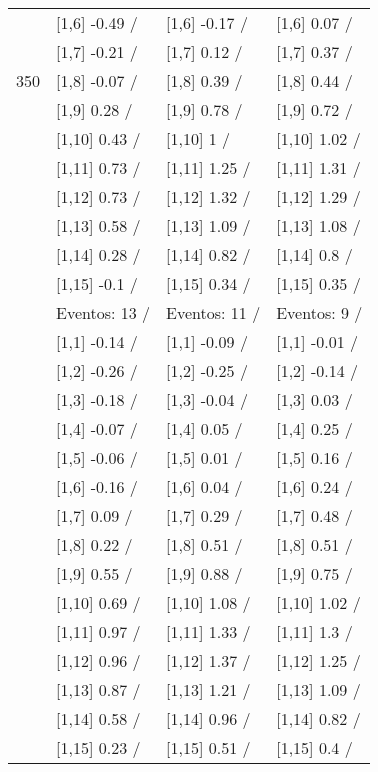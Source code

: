 \begin{table}
\begin{tabular}[t]{llll}
 & {}[1,6] -0.49  / & {}[1,6] -0.17  / & {}[1,6] 0.07  /\\
 & {}[1,7] -0.21  / & {}[1,7] 0.12  / & {}[1,7] 0.37  /\\
350 & {}[1,8] -0.07  / & {}[1,8] 0.39  / & {}[1,8] 0.44  /\\
\addlinespace
 & {}[1,9] 0.28  / & {}[1,9] 0.78  / & {}[1,9] 0.72  /\\
 & {}[1,10] 0.43  / & {}[1,10] 1  / & {}[1,10] 1.02  /\\
 & {}[1,11] 0.73  / & {}[1,11] 1.25  / & {}[1,11] 1.31  /\\
 & {}[1,12] 0.73  / & {}[1,12] 1.32  / & {}[1,12] 1.29  /\\
 & {}[1,13] 0.58  / & {}[1,13] 1.09  / & {}[1,13] 1.08  /\\
\addlinespace
 & {}[1,14] 0.28  / & {}[1,14] 0.82  / & {}[1,14] 0.8  /\\
 & {}[1,15] -0.1  / & {}[1,15] 0.34  / & {}[1,15] 0.35  /\\
 & Eventos:  13 / & Eventos:  11 / & Eventos:  9 /\\
 & {}[1,1] -0.14  / & {}[1,1] -0.09  / & {}[1,1] -0.01  /\\
 & {}[1,2] -0.26  / & {}[1,2] -0.25  / & {}[1,2] -0.14  /\\
\addlinespace
 & {}[1,3] -0.18  / & {}[1,3] -0.04  / & {}[1,3] 0.03  /\\
 & {}[1,4] -0.07  / & {}[1,4] 0.05  / & {}[1,4] 0.25  /\\
 & {}[1,5] -0.06  / & {}[1,5] 0.01  / & {}[1,5] 0.16  /\\
 & {}[1,6] -0.16  / & {}[1,6] 0.04  / & {}[1,6] 0.24  /\\
 & {}[1,7] 0.09  / & {}[1,7] 0.29  / & {}[1,7] 0.48  /\\
\addlinespace
500 & {}[1,8] 0.22  / & {}[1,8] 0.51  / & {}[1,8] 0.51  /\\
 & {}[1,9] 0.55  / & {}[1,9] 0.88  / & {}[1,9] 0.75  /\\
 & {}[1,10] 0.69  / & {}[1,10] 1.08  / & {}[1,10] 1.02  /\\
 & {}[1,11] 0.97  / & {}[1,11] 1.33  / & {}[1,11] 1.3  /\\
 & {}[1,12] 0.96  / & {}[1,12] 1.37  / & {}[1,12] 1.25  /\\
\addlinespace
 & {}[1,13] 0.87  / & {}[1,13] 1.21  / & {}[1,13] 1.09  /\\
 & {}[1,14] 0.58  / & {}[1,14] 0.96  / & {}[1,14] 0.82  /\\
 & {}[1,15] 0.23  / & {}[1,15] 0.51  / & {}[1,15] 0.4  /\\
\bottomrule
\end{tabular}
\end{table}
